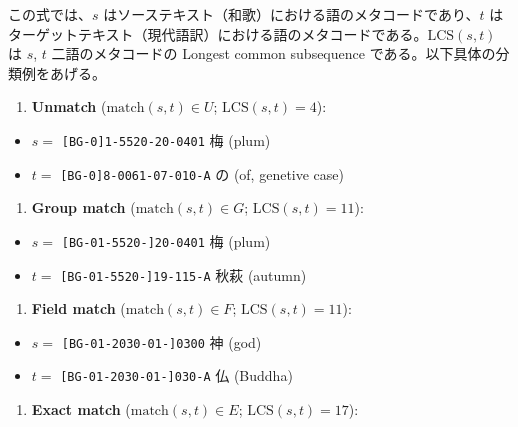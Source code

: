 \documentclass[
  letterpaper,
  DIV=11,
  numbers=noendperiod]{scrartcl}
\providecommand{\tightlist}{%
  \setlength{\itemsep}{0pt}\setlength{\parskip}{0pt}}\usepackage{longtable,booktabs,array}
\begin{document}
この式では、\(s\)
はソーステキスト（和歌）における語のメタコードであり、\(t\)
はターゲットテキスト（現代語訳）における語のメタコードである。\(\text{LCS}(s,t)\)
は \(s\), \(t\) 二語のメタコードの Longest common subsequence
である。以下具体の分類例をあげる。

\begin{enumerate}
\def\labelenumi{\arabic{enumi}.}
\tightlist
\item
  \textbf{Unmatch} (\(\text{match}(s,t) \in U\); \(\text{LCS}(s,t)=4\)):
\end{enumerate}

\begin{itemize}
\tightlist
\item
  \(s=\) \texttt{{[}BG-0{]}1-5520-20-0401} 梅 (plum)
\item
  \(t=\) \texttt{{[}BG-0{]}8-0061-07-010-A} の (of, genetive case)
\end{itemize}

\begin{enumerate}
\def\labelenumi{\arabic{enumi}.}
\setcounter{enumi}{1}
\tightlist
\item
  \textbf{Group match} (\(\text{match}(s,t) \in G\);
  \(\text{LCS}(s,t)=11\)):
\end{enumerate}

\begin{itemize}
\tightlist
\item
  \(s=\) \texttt{{[}BG-01-5520-{]}20-0401} 梅 (plum)
\item
  \(t=\) \texttt{{[}BG-01-5520-{]}19-115-A} 秋萩 (autumn)
\end{itemize}

\begin{enumerate}
\def\labelenumi{\arabic{enumi}.}
\setcounter{enumi}{2}
\tightlist
\item
  \textbf{Field match} (\(\text{match}(s,t) \in F\);
  \(\text{LCS}(s,t)=11\)):
\end{enumerate}

\begin{itemize}
\tightlist
\item
  \(s=\) \texttt{{[}BG-01-2030-01-{]}0300} 神 (god)
\item
  \(t=\) \texttt{{[}BG-01-2030-01-{]}030-A} 仏 (Buddha)
\end{itemize}

\begin{enumerate}
\def\labelenumi{\arabic{enumi}.}
\setcounter{enumi}{3}
\tightlist
\item
  \textbf{Exact match} (\(\text{match}(s,t) \in E\);
  \(\text{LCS}(s,t)=17\)):
\end{enumerate}
\end{document}
